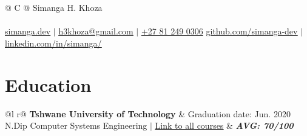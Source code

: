 \documentclass[a4paper,8pt]{article}
\begin{document}
\pagestyle{empty}


\begin{tabularx}{\linewidth}{@{} C @{}}
\color[HTML]{1C033C} \Huge{Simanga H. Khoza} \\[6pt]
\\
\textcolor[HTML]{371e77}{\underline{\href{https://simanga.dev/}{\raisebox{-0.05\height}{\faGlobe} simanga.dev}} $|$}
\textcolor[HTML]{371e77}{\underline{\href{mailto:h3khoza@gmail.com}{\raisebox{-0.05\height}{\faEnvelope} h3khoza@gmail.com}} $|$}
\textcolor[HTML]{371e77}{\href{tel:+27812490306}{\raisebox{-0.05\height}{\faMobile} +27 81 249 0306}}
\textcolor[HTML]{371e77}{\underline{\href{https://github.com/simanga-dev}{\raisebox{-0.05\height}{\faGithub} github.com/simanga-dev}} $|$}
\textcolor[HTML]{371e77}{\underline{\href{https://www.linkedin.com/in/simanga/}{\raisebox{-0.05\height}{\faLinkedin} linkedin.com/in/simanga/}}}
\\[4pt]
\end{tabularx}

\section{Education}
\begin{tabularx}{\linewidth}{ @{}l r@{} }
\color[HTML]{1C033C} \textbf{Tshwane University of Technology} & \hfill \color[HTML]{371e77} Graduation date: Jun. 2020 \\
\color[HTML]{371e77} N.Dip Computer Systems Engineering $|$ {\uline{\href{https://github.com/simanga-dev/simanga-dev.github.io/blob/40c3be6e23f2a5a44615d7b048085a03802c4972/public/static/documents/NDip_Computer_Systems_PhasingOut_2022.pdf}{Link to all courses}}} & \hfill \color[HTML]{4B28A4} \textit{\textbf{AVG: 70/100}} \\
\end{tabularx}

\end{document}
